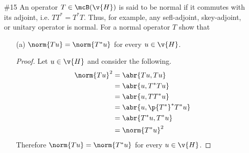 \documentclass[11pt, oneside]{article}
\begin{document}
\begin{enumerate}
\begin{proof}
\begin{align*}
        &= 1- \lim[n \to \infty]{\frac{2}{\frac{1}{n} + 1}\p{1 - \p{\frac{1}{n}}^{\frac{1}{n} + 1}}} + \lim[n \to \infty]{\frac{1}{\frac{2}{n} + 1}\p{1 - \p{\frac{1}{n}}^{\frac{2}{n} + 1}}} \\
        &= 1 - 2 + 1 = 0
      \end{align*}
      Therefore $Mu_n \to 1$ in $L^2(0, 1)$.
      Lastly I will show that $1 \not\in R(M)$ in order to show that $R(M)$ is
      not closed.
      If $1 \in R(M)$ then there exists $u \in L^2(0, 1)$ such that $xu(x) = 1$.
      This would imply that $u(x) = \frac{1}{x}$, however $\frac{1}{x}$ is not
      in $L^2(0, 1)$.
      To verify this consider the following.
      \begin{align*}
        \dintt{0}{1}{\abs{x^{-1}}^2}{x} &= \dintt{0}{1}{x^{-2}}{x} \\
        &= \eval{-x^{-1}}{x = 0}{1} \\
        &= -1 + \infty = \infty
      \end{align*}
      This shows that $x^{-1}$ is not in $L^2(0, 1)$.
    \end{proof}

  \pagebreak
  \item[\#15] %
    An operator $T \in \mcB(\v{H})$ is said to be normal if it commutes with
    its adjoint, i.e. $TT^* = T^*T$.
    Thus, for example, any sefl-adjoint, skey-adjoint, or unitary operator is
    normal.
    For a normal operator $T$ show that
    \begin{enumerate}
      \item[(a)] %
        $\norm{Tu} = \norm{T^*u}$ for every $u \in \v{H}$.

        \begin{proof}
          Let $u \in \v{H}$ and consider the following.
          \begin{align*}
            \norm{Tu}^2 &= \abr{Tu, Tu} \\
                        &= \abr{u, T^* T u} \\
                        &= \abr{u, T T^* u} \\
                        &= \abr{u, \p{T^*}^* T^* u} \\
                        &= \abr{T^*u, T^* u} \\
                        &= \norm{T^* u}^2
          \end{align*}
          Therefore $\norm{Tu} = \norm{T^* u}$ for every $u \in \v{H}$.
        \end{proof}


\end{enumerate}
\end{enumerate}
\end{document}
